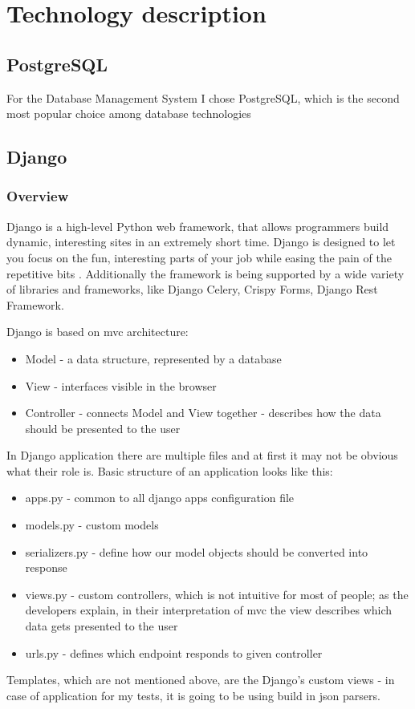 
\chapter{Technology description}


\section{PostgreSQL}

For the Database Management System I chose PostgreSQL, which is the second most popular choice among database technologies %

\section{Django}

\subsection{Overview}
Django is a high-level Python web framework, that allows programmers build dynamic, interesting sites in an extremely short time. Django is designed to let you focus on the fun, interesting parts of your job while easing the pain of the repetitive bits \cite{djangobook}. Additionally the framework is being supported by a wide variety of libraries and frameworks, like Django Celery, Crispy Forms, Django Rest Framework.

Django is based on \acrshort{mvc} architecture:
\begin{itemize}
    \item Model - a data structure, represented by a database
    \item View - interfaces visible in the browser
    \item Controller - connects Model and View together - describes how the data should be presented to the user
\end{itemize}
In Django application there are multiple files and at first it may not be obvious what their role is. Basic structure of an application looks like this:
\begin{itemize}
    \item apps.py - common to all django apps configuration file
    \item models.py - custom models
    \item serializers.py - define how our model objects should be converted into response
    \item views.py - custom controllers, which is not intuitive for most of people; as the developers explain, in their interpretation of \acrshort{mvc} the view describes which data gets presented to the user \cite{djangoWhyViews}
    \item urls.py - defines which endpoint responds to given controller
\end{itemize}
Templates, which are not mentioned above, are the Django's custom views - in case of application for my tests, it is going to be using build in json parsers.

